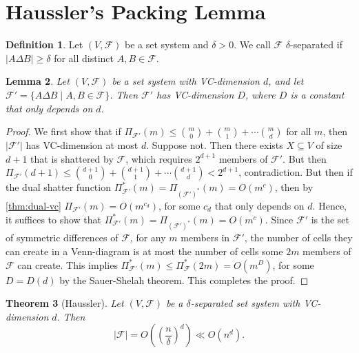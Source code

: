 \documentclass[12pt,reqno]{amsart}
\newtheorem{theorem}{Theorem}[section]
\newtheorem{lemma}[theorem]{Lemma}
\theoremstyle{definition}
\newtheorem{definition}[theorem]{Definition}
\theoremstyle{remark}
\renewcommand{\leq}{\leqslant}
\renewcommand{\geq}{\geqslant}
\def\F{\mathcal{F}}
\numberwithin{equation}{section}
\begin{document}
\newpage

\section{Haussler's Packing Lemma}

\begin{definition}
	Let $(V, \F)$ be a set system and $\delta > 0$. We call $\F$ $\delta$-separated if $|A \Delta B| \geq \delta$ for all distinct $A, B \in \F$.
\end{definition}

\begin{lemma}\label{lem:haussler}
	Let $(V, \F)$ be a set system with VC-dimension $d$, and let $\F' = \{A \Delta B \mid A, B \in \F\}$. Then $\F'$ has VC-dimension $D$, where $D$ is a constant that only depends on $d$.
\end{lemma}

\begin{proof}
	We first show that if $\Pi_{\F'}(m) \leq \binom{m}{0} + \binom{m}{1} + \cdots \binom{m}{d}$ for all $m$, then $|\F'|$ has VC-dimension at most $d$. Suppose not. Then there exists $X \subseteq V$ of size $d + 1$ that is shattered by $\F$, which requires $2^{d + 1}$ members of $\F'$. But then $\Pi_{\F'}(d + 1) \leq \binom{d + 1}{0} + \binom{d + 1}{1} + \cdots \binom{d + 1}{d} < 2^{d + 1}$, contradiction. But then if the dual shatter function $\Pi^*_{\F'}(m) = \Pi_{(\F')^*}(m) = O(m^c)$, then by \cref{thm:dual-vc} $\Pi_{\F'}(m) = O(m^{c_d})$, for some $c_d$ that only depends on $d$. Hence, it suffices to show that $\Pi^*_{\F'}(m) = \Pi_{(\F')^*}(m) = O(m^c)$. Since $\F'$ is the set of symmetric differences of $\F$, for any $m$ members in $\F'$, the number of cells they can create in a Venn-diagram is at most the number of cells some $2m$ members of $\F$ can create. This implies $\Pi_{\F'}^*(m) \leq \Pi_\F^*(2m) = O(m^D)$, for some $D = D(d)$ by the Sauer-Shelah theorem. This completes the proof.
\end{proof}

\begin{theorem}[Haussler]
	Let $(V, \F)$ be a $\delta$-separated set system with VC-dimension $d$. Then 
	\[
		|\F| = O\left(\left(\frac{n}{\delta}\right)^d\right) \ll O(n^d).
	\]
\end{theorem}
\end{document}
